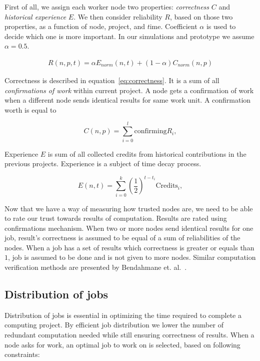 First of all, we assign each worker node two properties: \emph{correctness} $C$ and \emph{historical experience} $E$. We then consider reliability $R$, based on those two properties, as a function of $n$ode, $p$roject, and $t$ime. Coefficient $\alpha$ is used to decide which one is more important. In our simulations and prototype we assume $\alpha = 0.5$.

\begin{align} \label{eqn:R}
R(n, p, t) = \alpha {E}_{norm}(n,t) + (1-\alpha)  C_{norm}(n, p)  \nonumber
\end{align}

Correctness is described in equation~\ref{eq:correctness}. It is a sum of all \emph{confirmations of work} within current project. A node gets a confirmation of work when a different node sends identical results for same work unit. A confirmation worth is equal to 

\begin{equation} \label{eq:correctness}
C(n, p) = \sum_{i=0}^{l} \text{confirming} R_i,
\end{equation}

Experience $E$ is sum of all collected credits from historical contributions in the previous projects. 
Experience is a subject of time decay process.

\begin{equation}
E(n,t) = \sum_{i=0}^{k} (\frac{1}{2})^{t-t_i} \text{Credits}_i,
\end{equation}

Now that we have a way of measuring how trusted nodes are, we need to be able to rate our trust towards results of computation. Results are rated using confirmations mechanism. When two or more nodes send identical results for one job, result's correctness is assumed to be equal of a sum of reliabilities of the nodes. When a job has a set of results which correctness is greater or equals than $1$, job is assumed to be done and is not given to more nodes. Similar computation verification methods are presented by Bendahmane et. al.~\cite{bendahmane2012result}.

\subsection{Distribution of jobs}
\label{s:jobdist}

Distribution of jobs is essential in optimizing the time required to complete a computing project. By efficient job distribution we lower the number of redundant computation needed while still ensuring correctness of results. When a node asks for work, an optimal job to work on is selected, based on following constraints:


